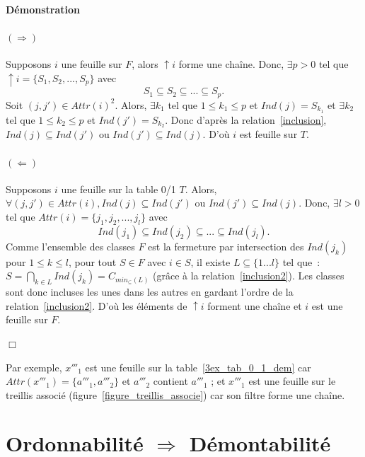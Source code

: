 \documentclass[a4paper]{report}
\renewcommand{\textbf}[1]{\begingroup\bfseries\mathversion{bold}#1\endgroup}
\newenvironment{preuve}{\textbf{Démonstration}}{}
\begin{document}
\begin{preuve}


\paragraph{$(\Rightarrow)$}
Supposons $i$ une feuille sur $F$, alors $\uparrow i$ forme une chaîne. 
Donc, $\exists p > 0$ tel que $\uparrow i = \{S_1, S_2,..., S_p\}$ avec
\begin{equation}
\label{inclusion}
 S_1 \subseteq S_2 \subseteq ... \subseteq S_p.
\end{equation}
Soit $(j, j') \in Attr(i)^2$. 
Alors,
$\exists k_1$ tel que  $1 \leqslant k_1 \leqslant p$ et $Ind(j) = S_{k_1}$
et
$\exists k_2$ tel que  $1 \leqslant k_2 \leqslant p$ et $Ind(j') = S_{k_2}$.
Donc d'après la relation~\ref{inclusion}, $Ind(j) \subseteq Ind(j')$ ou $Ind(j') \subseteq Ind(j)$. D'où $i$ est feuille sur $T$.

\paragraph{$(\Leftarrow)$}
Supposons $i$ une feuille sur la table 0/1 $T$. 
Alors, $\forall (j, j') \in Attr(i), Ind(j) \subseteq Ind(j')$ ou $Ind(j') \subseteq Ind(j)$. 
Donc, $\exists l > 0$ tel que $Attr(i) = \{j_1, j_2,..., j_l\}$  avec
\begin{equation}
\label{inclusion2}
 Ind(j_1) \subseteq Ind(j_2) \subseteq ... \subseteq Ind(j_l).
\end{equation}
Comme l'ensemble des classes $F$ est la fermeture par intersection 
des $Ind(j_k)$ pour $1 \leqslant k \leqslant l$, 
pour tout $S \in F$ avec $i \in S$, il existe $L \subseteq \{1...l\}$ tel que~:
 $S = \bigcap_{k \in L} Ind(j_k) = C_{min_{\subseteq}(L)}$ 
(grâce à la relation~\ref{inclusion2}). 
Les classes sont donc incluses les unes dans les autres en gardant l'ordre de la relation~\ref{inclusion2}.
D'où les éléments de $\uparrow i$ forment une chaîne et $i$ est une feuille sur $F$.

$\Box$
\end{preuve}

Par exemple, $x'''_1$ est une feuille sur la table~\ref{3ex_tab_0_1_dem} car $Attr(x'''_1) =\{a'''_1, a'''_2\}$ et  $a'''_2$ contient $a'''_1$ ; 
et $x'''_1$ est une feuille sur le treillis associé (figure~\ref{figure_treillis_associe}) car son filtre forme une chaîne.

\section{Ordonnabilité $\Rightarrow$ Démontabilité}
\end{document}
